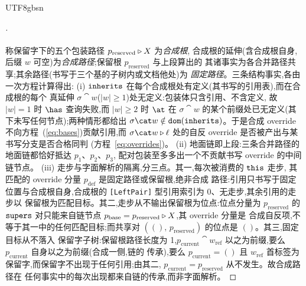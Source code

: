 \begin{CJK*}{UTF8}{gbsn}
\begin{proof}[]
  \paragraph{}
  称保留字下的五个包装路径 $p_{\mathrm{reserved}} \mathbin{\triangleright} X$ 为\emph{合成根},
  合成根的延伸(含合成根自身,后缀 $w$ 可空)为\emph{合成路径};保留根 $p_{\mathrm{reserved}}$ 与上段算出的
  其诸事实为各合并路径共享;其余路径(书写于三个基的子树内或文档他处)为
  \emph{固定路径}。三条结构事实,各由一次方程计算得出:
  (i) $\mathtt{inherits}$ 在每个合成根处有定义(其书写的引用表),而在合成根的每个
  真延伸 $\sigma \cat w$($|w| \ge 1$)处无定义:包装体只含引用、不含定义,
  故 $|w| = 1$ 时 $\has$ 查询失败,而 $|w| \ge 2$ 时 $\at$ 在
  $\sigma \cat w$ 的某个前缀处已无定义(其下未写任何节点);两种情形都给出
  $\sigma \cat w \notin \dom(\inherits)$。于是合成
  override 不向方程~(\ref{eq:bases})贡献引用,而 $\sigma \cat w \snoc \ell$
  处的自反 override 是否被产出与某书写分支是否合格同判
  (方程~\ref{eq:overrides})。
  (ii) 地面链即上段:三条合并路径的地面链都恰好抵达 $p_1$、$p_2$、$p_3$,
  配对包装至多多出一个不贡献书写 override 的中间链节点。
  (iii) 走步与字面解析的隔离,分三点。其一,每次被消费的 $\mathtt{this}$ 走步,
  其匹配的 override 分量 $p_{\mathrm{def}}$ 是固定路径或保留根,绝非合成
  路径:引用只书写于固定位置与合成根自身,合成根的
  \texttt{[LeftPair]} 型引用索引为 0、无走步,其余引用的走步以
  保留根为匹配目标。其二,走步从不输出保留根为位点:位点分量为
  $p_{\mathrm{reserved}}$ 的 $\mathtt{supers}$ 对只能来自链节点
  $p_{\mathrm{base}} = p_{\mathrm{reserved}} \mathbin{\triangleright} X$,其 override 分量是
  合成自反项,不等于其一中的任何匹配目标;而共享对
  $((),\, p_{\mathrm{reserved}})$ 的位点是 $()$。其三,固定目标从不落入
  保留字子树:保留根路径长度为 1,$p_{\mathrm{current}} \cat w_{\mathrm{ref}}$
  以之为前缀,要么 $p_{\mathrm{current}}$ 自身以之为前缀(合成一侧,链的
  传承),要么 $p_{\mathrm{current}} = ()$ 且 $w_{\mathrm{ref}}$ 首标签为
  保留字,而保留字不出现于任何引用;由其二,
  $p_{\mathrm{current}} = p_{\mathrm{reserved}}$ 从不发生。故合成路径在
  任何事实中的每次出现都来自链的传承,而非字面解析。


\end{proof}
\end{CJK*}
